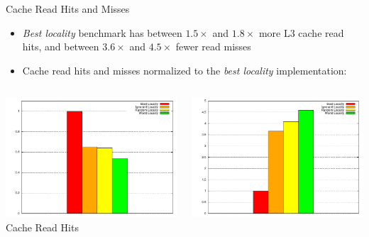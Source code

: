\begin{frame}{Cache Read Hits and Misses}
  \begin{itemize}
  \item \emph{Best locality} benchmark has between $1.5\times$ and
    $1.8\times$ more L3 cache read hits, and between $3.6\times$ and
    $4.5\times$ fewer read misses
  \item Cache read hits and misses normalized to the \emph{best
      locality} implementation:
  \end{itemize}
  

  \begin{columns}[c]
    \begin{column}{0.50\textwidth}
      \begin{center}
        \includegraphics[width=\textwidth]{figures/cache-stress-test-cache-hits} \\
        \tiny{Cache Read Hits}     
      \end{center}
    \end{column}
    \begin{column}{0.50\textwidth}
      \begin{center}
        \includegraphics[width=\textwidth]{figures/cache-stress-test-cache-misses} \\

\end{center}
\end{column}
\end{columns}
\end{frame}

